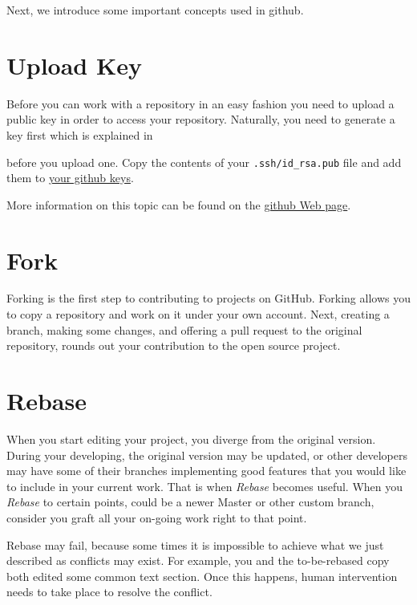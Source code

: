 Next, we introduce some important concepts used in github.

\section{Upload Key}\label{upload-key}

Before you can work with a repository in an easy fashion you need to
upload a public key in order to access your repository. Naturally, you
need to generate a key first which is explained in 


before you upload one. Copy the contents of your
\verb|.ssh/id_rsa.pub| file and add them to
\href{https://github.com/settings/keys}{your github keys}.

More information on this topic can be found on the
\href{https://help.github.com/articles/adding-a-new-ssh-key-to-your-github-account/}{github
  Web page}.

\section{Fork}\label{fork}

Forking is the first step to contributing to projects on GitHub. Forking
allows you to copy a repository and work on it under your own account.
Next, creating a branch, making some changes, and offering a pull
request to the original repository, rounds out your contribution to the
open source project.


\section{Rebase}\label{rebase}

When you start editing your project, you diverge from the original
version. During your developing, the original version may be updated, or
other developers may have some of their branches implementing good
features that you would like to include in your current work. That is
when {\em Rebase} becomes useful. When you {\em Rebase} to certain points, could
be a newer Master or other custom branch, consider you graft all your
on-going work right to that point.

Rebase may fail, because some times it is impossible to achieve what we
just described as conflicts may exist. For example, you and the to-be-rebased copy
both edited some common text section. Once this happens, human
intervention needs to take place to resolve the conflict.

